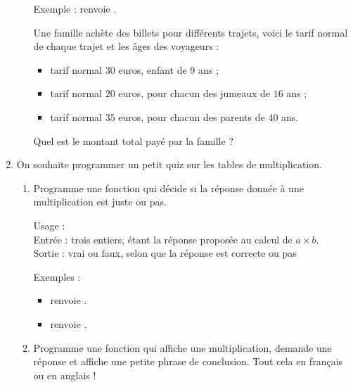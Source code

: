 \documentclass[11pt,class=report,crop=false]{standalone}
\begin{document}
\begin{activite}
\begin{enumerate}
\begin{enumerate}
\begin{fonction}[\ci{montant()}]
  Exemple :  renvoie .
  \end{fonction} 
  
  Une famille achète des billets pour différents trajets, voici le tarif normal de chaque trajet et les âges des voyageurs : 
  \begin{itemize}
    \item tarif normal $30$ euros, enfant de $9$ ans ;
    
    \item tarif normal $20$ euros, pour chacun des jumeaux de $16$ ans ;
    
    \item tarif normal $35$ euros, pour chacun des parents de $40$ ans.
  \end{itemize}
  Quel est le montant total payé par la famille ?
 
  \end{enumerate}
  
  
  \item On souhaite programmer un petit quiz sur les tables de multiplication.
  
  \begin{enumerate}
    \item Programme une fonction  qui décide si la réponse donnée à une multiplication est juste ou pas.
    
\begin{fonction}
  Usage :  \\
  Entrée : trois entiers,  étant la réponse proposée au calcul de $a \times b$.\\
  Sortie : \og{}vrai\fg{} ou \og{}faux\fg{}, selon que la réponse est correcte ou pas
  
  \medskip
    
  Exemples : 
  \begin{itemize}
    \item {} renvoie .
    \item {} renvoie .
  \end{itemize}
  \end{fonction}  
  
  
    \item Programme une fonction qui affiche une multiplication, demande une réponse et affiche une petite phrase de conclusion. Tout cela en français ou en anglais !
    

\end{enumerate}
\end{enumerate}
\end{activite}
\end{document}
